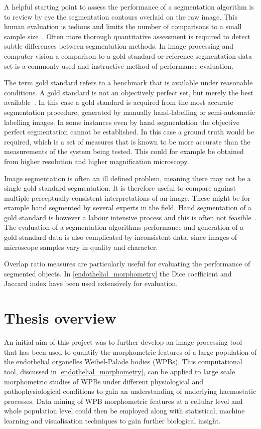 A helpful starting point to assess the performance of a segmentation algorithm is to review by eye the segmentation contours overlaid on the raw image. This human evaluation is tedious and limits the number of comparisons to a small sample size~\cite{Zhang2008}. Often more thorough quantitative assessment is required to detect subtle differences between segmentation methods. In image processing and computer vision a comparison to a gold standard or reference segmentation data set is a commonly used and instructive method of performance evaluation.

The term gold standard refers to a benchmark that is available under reasonable conditions. A gold standard is not an objectively perfect set, but merely the best available~\cite{Cardoso2014}. In this case a gold standard is acquired from the most accurate segmentation procedure, generated by manually hand-labelling or semi-automatic labelling images. In some instances even by hand segmentation the objective perfect segmentation cannot be established. In this case a ground truth would be required, which is a set of measures that is known to be more accurate than the measurements of the system being tested. This could for example be obtained from higher resolution and higher magnification microscopy.

Image segmentation is often an ill defined problem, meaning there may not be a single gold standard segmentation. It is therefore useful to compare against multiple perceptually consistent interpretations of an image. These might be for example hand segmented by several experts in the field. Hand segmentation of a gold standard is however a labour intensive process and this is often not feasible~\cite{Unnikrishnan2005}. The evaluation of a segmentation algorithms performance and generation of a gold standard data is also complicated by inconsistent data, since images of microscope samples vary in quality and character.

Overlap ratio measures are particularly useful for evaluating the performance of segmented objects. In \autoref{endothelial_morphometry} the Dice coefficient and Jaccard index have been used extensively for evaluation.

\section{Thesis overview}
\label{introduction:overview}
An initial aim of this project was to further develop an image processing tool that has been used to quantify the morphometric features of a large population of the endothelial organelles Weibel-Palade bodies (WPBs). This computational tool, discussed in \autoref{endothelial_morphometry}, can be applied to large scale morphometric studies of WPBs under different physiological and pathophysiological conditions to gain an understanding of underlying haemostatic processes. Data mining of WPB morphometric features at a cellular level and whole population level could then be employed along with statistical, machine learning and visualisation techniques to gain further biological insight.

